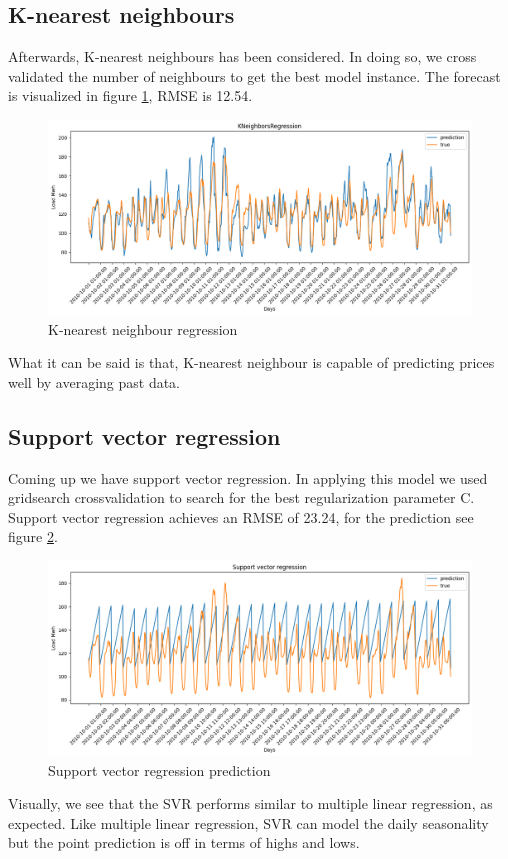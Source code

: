 \subsection{K-nearest neighbours}
Afterwards, K-nearest neighbours has been considered. In doing so, we cross validated the number of neighbours to get the best model instance. The forecast is visualized in figure \ref{fig:knn_price}, RMSE is 12.54.
\begin{figure}[!h]
    \includegraphics[width=\textwidth]{images/knn_price.png}
    \caption{K-nearest neighbour regression}
    \label{fig:knn_price}
\end{figure}
What it can be said is that, K-nearest neighbour is capable of predicting prices well by averaging past data.

\subsection{Support vector regression}
Coming up we have support vector regression. In applying this model we used gridsearch crossvalidation to search for the best regularization parameter C. Support vector regression achieves an RMSE of 23.24, for the prediction see figure \ref{fig:svr_price}.
\begin{figure}[!h]
    \includegraphics[width=\textwidth]{images/svr_price.png}
    \caption{Support vector regression prediction}
    \label{fig:svr_price}
\end{figure}
Visually, we see that the SVR performs similar to multiple linear regression, as expected. Like multiple linear regression, SVR can model the daily seasonality but the point prediction is off in terms of highs and lows.


